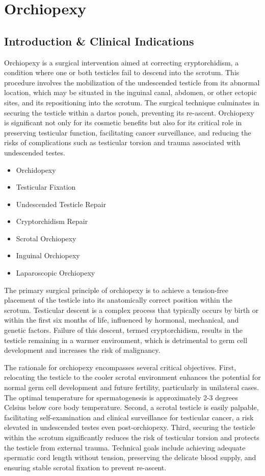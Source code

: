 \chapter{Orchiopexy}

\section*{Introduction \& Clinical Indications}
Orchiopexy is a surgical intervention aimed at correcting cryptorchidism, a condition where one or both testicles fail to descend into the scrotum. This procedure involves the mobilization of the undescended testicle from its abnormal location, which may be situated in the inguinal canal, abdomen, or other ectopic sites, and its repositioning into the scrotum. The surgical technique culminates in securing the testicle within a dartos pouch, preventing its re-ascent. Orchiopexy is significant not only for its cosmetic benefits but also for its critical role in preserving testicular function, facilitating cancer surveillance, and reducing the risks of complications such as testicular torsion and trauma associated with undescended testes.

\begin{itemize}
  \item Orchidopexy
  \item Testicular Fixation
  \item Undescended Testicle Repair
  \item Cryptorchidism Repair
  \item Scrotal Orchiopexy
  \item Inguinal Orchiopexy
  \item Laparoscopic Orchiopexy
\end{itemize}

The primary surgical principle of orchiopexy is to achieve a tension-free placement of the testicle into its anatomically correct position within the scrotum. Testicular descent is a complex process that typically occurs by birth or within the first six months of life, influenced by hormonal, mechanical, and genetic factors. Failure of this descent, termed cryptorchidism, results in the testicle remaining in a warmer environment, which is detrimental to germ cell development and increases the risk of malignancy.

The rationale for orchiopexy encompasses several critical objectives. First, relocating the testicle to the cooler scrotal environment enhances the potential for normal germ cell development and future fertility, particularly in unilateral cases. The optimal temperature for spermatogenesis is approximately 2-3 degrees Celsius below core body temperature. Second, a scrotal testicle is easily palpable, facilitating self-examination and clinical surveillance for testicular cancer, a risk elevated in undescended testes even post-orchiopexy. Third, securing the testicle within the scrotum significantly reduces the risk of testicular torsion and protects the testicle from external trauma. Technical goals include achieving adequate spermatic cord length without tension, preserving the delicate blood supply, and ensuring stable scrotal fixation to prevent re-ascent.


